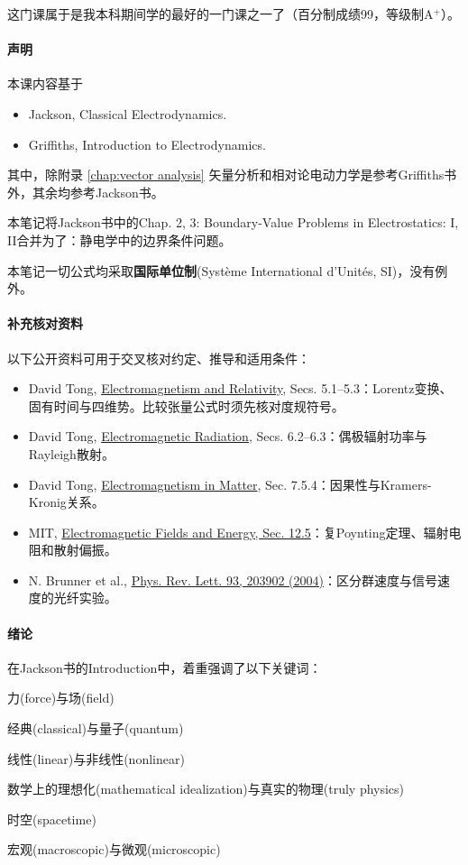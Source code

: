 \preface

这门课属于是我本科期间学的最好的一门课之一了（百分制成绩99，等级制A$^+$）。

\paragraph{声明}

本课内容基于
\begin{itemize}
	\item Jackson, Classical Electrodynamics.
	\item Griffiths, Introduction to Electrodynamics.
\end{itemize}
其中，除附录 \ref{chap:vector analysis} 矢量分析和相对论电动力学是参考Griffiths书外，其余均参考Jackson书。

本笔记将Jackson书中的Chap. 2, 3: Boundary-Value Problems in Electrostatics: I, II合并为了：静电学中的边界条件问题。

本笔记一切公式均采取\textbf{国际单位制}(Système International d'Unités, SI)，没有例外。


\paragraph{补充核对资料}
以下公开资料可用于交叉核对约定、推导和适用条件：
\begin{itemize}
    \item David Tong, \href{https://www.damtp.cam.ac.uk/user/tong/em/el4.pdf}{Electromagnetism and Relativity}, Secs. 5.1--5.3：Lorentz变换、固有时间与四维势。比较张量公式时须先核对度规符号。
    \item David Tong, \href{https://www.damtp.cam.ac.uk/user/tong/em/el5.pdf}{Electromagnetic Radiation}, Secs. 6.2--6.3：偶极辐射功率与Rayleigh散射。
    \item David Tong, \href{https://www.damtp.cam.ac.uk/user/tong/em/el6.pdf}{Electromagnetism in Matter}, Sec. 7.5.4：因果性与Kramers-Kronig关系。
    \item MIT, \href{https://web.mit.edu/6.013_book/www/chapter12/12.5.html}{Electromagnetic Fields and Energy, Sec. 12.5}：复Poynting定理、辐射电阻和散射偏振。
    \item N. Brunner et al., \href{https://doi.org/10.1103/PhysRevLett.93.203902}{Phys. Rev. Lett. 93, 203902 (2004)}：区分群速度与信号速度的光纤实验。
\end{itemize}

\paragraph{绪论}

在Jackson书的Introduction中，着重强调了以下关键词：
\begin{compactitem}
	\item 力(force)与场(field)
	\item 经典(classical)与量子(quantum)
	\item 线性(linear)与非线性(nonlinear)
	\item 数学上的理想化(mathematical idealization)与真实的物理(truly physics)
	\item 时空(spacetime)
	\item 宏观(macroscopic)与微观(microscopic)
\end{compactitem}
